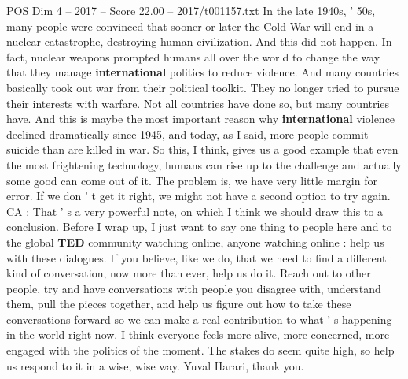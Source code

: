 \begin{textsample}{POS Dim 4 – 2017 – Score 22.00 – 2017/t001157.txt}
In the late 1940s, ' 50s, many people were convinced that sooner or later the Cold War will end in a nuclear catastrophe, destroying human civilization.
And this did not happen.
In fact, nuclear weapons prompted humans all over the world to change the way that they manage \textbf{international} politics to reduce violence.
And many countries basically took out war from their political toolkit.
They no longer tried to pursue their interests with warfare.
Not all countries have done so, but many countries have.
And this is maybe the most important reason why \textbf{international} violence declined dramatically since 1945, and today, as I said, more people commit suicide than are killed in war.
So this, I think, gives us a good example that even the most frightening technology, humans can rise up to the challenge and actually some good can come out of it.
The problem is, we have very little margin for error.
If we don ' t get it right, we might not have a second option to try again.
CA : That ' s a very powerful note, on which I think we should draw this to a conclusion.
Before I wrap up, I just want to say one thing to people here and to the global \textbf{TED} community watching online, anyone watching online : help us with these dialogues.
If you believe, like we do, that we need to find a different kind of conversation, now more than ever, help us do it.
Reach out to other people, try and have conversations with people you disagree with, understand them, pull the pieces together, and help us figure out how to take these conversations forward so we can make a real contribution to what ' s happening in the world right now.
I think everyone feels more alive, more concerned, more engaged with the politics of the moment.
The stakes do seem quite high, so help us respond to it in a wise, wise way.
Yuval Harari, thank you.

\end{textsample}

